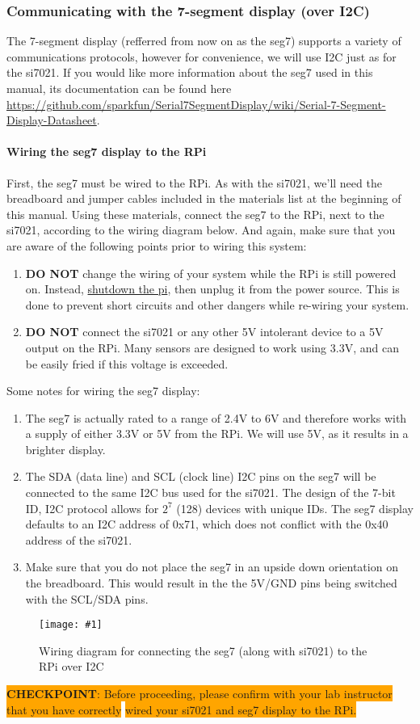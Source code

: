 \documentclass{article}
\newcommand{\imagefigb}[2]{
    \begin{figure}[H]
        \centering
        \texttt{[image: \#1]}
        \caption{#2}
    \end{figure}
}
\newcommand{\checkpoint}[2]{
    \newline \newline
    \noindent
    \colorbox{Orange}{\textbf{CHECKPOINT}: #1} \newline \colorbox{Orange}{#2}
    \newline \newline
}
\begin{document}
  \subsubsection{Communicating with the 7-segment display (over I2C)}
  The 7-segment display (refferred from now on as the seg7) supports a variety of communications protocols, however for convenience, we will use I2C just as for the si7021. If you would like more information about the seg7 used in this manual, its documentation can be found here \newline\href{https://github.com/sparkfun/Serial7SegmentDisplay/wiki/Serial-7-Segment-Display-Datasheet}{https://github.com/sparkfun/Serial7SegmentDisplay/wiki/Serial-7-Segment-Display-Datasheet}.
    \paragraph{Wiring the seg7 display to the RPi}
    First, the seg7 must be wired to the RPi. As with the si7021, we'll need the breadboard and jumper cables included in the materials list at the beginning of this manual. Using these materials, connect the seg7 to the RPi, next to the si7021, according to the wiring diagram below. And again, make sure that you are aware of the following points prior to wiring this system:
    \begin{enumerate}
      \item \textbf{DO NOT} change the wiring of your system while the RPi is still powered on. Instead, \hyperref[sec:shutting-down]{shutdown the pi}, then unplug it from the power source. This is done to prevent short circuits and other dangers while re-wiring your system.
      \item \textbf{DO NOT} connect the si7021 or any other 5V intolerant device to a 5V output on the RPi. Many sensors are designed to work using 3.3V, and can be easily fried if this voltage is exceeded.
    \end{enumerate}
    Some notes for wiring the seg7 display:
    \begin{enumerate}
      \item The seg7 is actually rated to a range of 2.4V to 6V and therefore works with a supply of either 3.3V or 5V from the RPi. We will use 5V, as it results in a brighter display.
      \item The SDA (data line) and SCL (clock line) I2C pins on the seg7 will be connected to the same I2C bus used for the si7021. The design of the 7-bit ID, I2C protocol allows for $2^7$ (128) devices with unique IDs. The seg7 display defaults to an I2C address of 0x71, which does not conflict with the 0x40 address of the si7021.
      \item Make sure that you do not place the seg7 in an upside down orientation on the breadboard. This would result in the the 5V/GND pins being switched with the SCL/SDA pins.
    \end{enumerate}
    \newline
    \noindent
    \imagefigb{si7021-seg7-wiring-diagram.png}{Wiring diagram for connecting the seg7 (along with si7021) to the RPi over I2C}
    \checkpoint{Before proceeding, please confirm with your lab instructor that you have correctly}{wired your si7021 and seg7 display to the RPi.}
\end{document}
